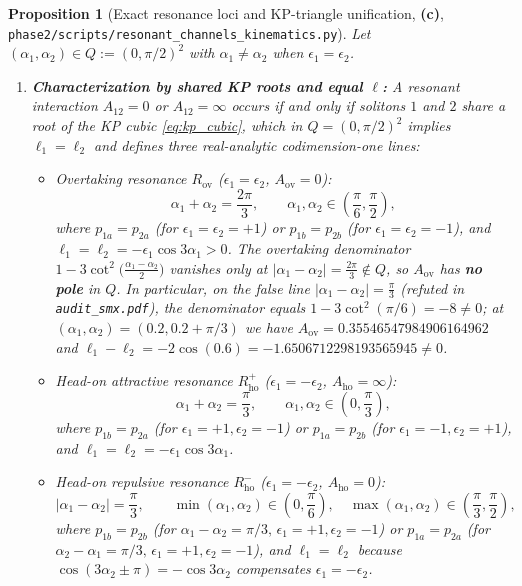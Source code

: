 \documentclass[11pt,a4paper]{article}
\newcommand{\Lc}{\textsf{\textbf{(c)}}\xspace}
\newcommand{\skin}{\texttt{phase2/\allowbreak scripts/\allowbreak resonant\_\allowbreak channels\_\allowbreak kinematics.py}}
\newtheorem{proposition}{Proposition}[section]
\theoremstyle{remark}
\begin{document}
\begin{proposition}[Exact resonance loci and KP-triangle unification, \Lc, \skin]\label{prop:resonances}
Let $(\alpha_1,\alpha_2) \in Q := (0,\pi/2)^2$ with $\alpha_1 \ne \alpha_2$ when
$\epsilon_1 = \epsilon_2$.
\begin{enumerate}
\item \textbf{Characterization by shared KP roots and equal $\ell$:}
A resonant interaction $A_{12} = 0$ or $A_{12} = \infty$ occurs if and only if
solitons $1$ and $2$ share a root of the KP cubic \eqref{eq:kp_cubic}, which in
$Q = (0,\pi/2)^2$ implies $\ell_1 = \ell_2$ and defines three real-analytic
codimension-one lines:
\begin{itemize}
\item \emph{Overtaking resonance $R_{\mathrm{ov}}$ ($\epsilon_1 = \epsilon_2$, $A_{\mathrm{ov}} = 0$):}
\begin{equation}\label{eq:R_ov}
  \alpha_1 + \alpha_2 = \frac{2\pi}{3}, \qquad \alpha_1,\alpha_2 \in \left(\frac{\pi}{6},\frac{\pi}{2}\right),
\end{equation}
where $p_{1a} = p_{2a}$ (for $\epsilon_1=\epsilon_2=+1$) or $p_{1b} = p_{2b}$
(for $\epsilon_1=\epsilon_2=-1$), and $\ell_1 = \ell_2 = -\epsilon_1\cos 3\alpha_1 > 0$.
The overtaking denominator $1 - 3\cot^2\!\big(\frac{\alpha_1-\alpha_2}{2}\big)$
vanishes only at $|\alpha_1-\alpha_2| = \frac{2\pi}{3} \notin Q$, so
$A_{\mathrm{ov}}$ has \textbf{no pole} in $Q$. In particular, on the false line
$|\alpha_1-\alpha_2| = \frac{\pi}{3}$ (refuted in \texttt{audit\_smx.pdf}), the
denominator equals $1 - 3\cot^2(\pi/6) = -8 \ne 0$; at $(\alpha_1,\alpha_2)=(0.2,0.2+\pi/3)$
we have $A_{\mathrm{ov}} = 0.35546547984906164962$ and
$\ell_1-\ell_2 = -2\cos(0.6) = -1.6506712298193565945 \ne 0$.

\item \emph{Head-on attractive resonance $R_{\mathrm{ho}}^+$ ($\epsilon_1 = -\epsilon_2$, $A_{\mathrm{ho}} = \infty$):}
\begin{equation}\label{eq:R_ho_plus}
  \alpha_1 + \alpha_2 = \frac{\pi}{3}, \qquad \alpha_1,\alpha_2 \in \left(0,\frac{\pi}{3}\right),
\end{equation}
where $p_{1b} = p_{2a}$ (for $\epsilon_1=+1,\epsilon_2=-1$) or $p_{1a} = p_{2b}$
(for $\epsilon_1=-1,\epsilon_2=+1$), and $\ell_1 = \ell_2 = -\epsilon_1\cos 3\alpha_1$.

\item \emph{Head-on repulsive resonance $R_{\mathrm{ho}}^-$ ($\epsilon_1 = -\epsilon_2$, $A_{\mathrm{ho}} = 0$):}
\begin{equation}\label{eq:R_ho_minus}
  |\alpha_1 - \alpha_2| = \frac{\pi}{3}, \qquad
  \min(\alpha_1,\alpha_2) \in \left(0,\frac{\pi}{6}\right), \quad
  \max(\alpha_1,\alpha_2) \in \left(\frac{\pi}{3},\frac{\pi}{2}\right),
\end{equation}
where $p_{1b} = p_{2b}$ (for $\alpha_1 - \alpha_2 = \pi/3,\,\epsilon_1=+1,\epsilon_2=-1$)
or $p_{1a} = p_{2a}$ (for $\alpha_2 - \alpha_1 = \pi/3,\,\epsilon_1=+1,\epsilon_2=-1$),
and $\ell_1 = \ell_2$ because $\cos(3\alpha_2\pm\pi) = -\cos 3\alpha_2$
compensates $\epsilon_1 = -\epsilon_2$.
\end{itemize}


\end{enumerate}
\end{proposition}
\end{document}
